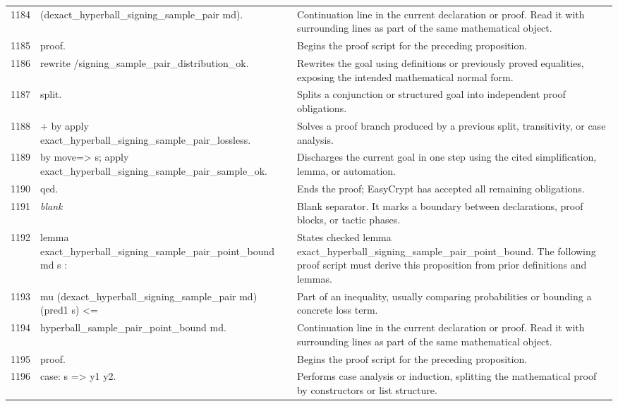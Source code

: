 \documentclass[10pt]{article}
\begin{document}
\begin{longtable}{r L{0.53\textwidth} L{0.37\textwidth}}
1184 & {\ttfamily\scriptsize     (dexact\_hyperball\_signing\_sample\_pair md).} & Continuation line in the current declaration or proof.  Read it with surrounding lines as part of the same mathematical object. \\
1185 & {\ttfamily\scriptsize proof.} & Begins the proof script for the preceding proposition. \\
1186 & {\ttfamily\scriptsize rewrite /signing\_sample\_pair\_distribution\_ok.} & Rewrites the goal using definitions or previously proved equalities, exposing the intended mathematical normal form. \\
1187 & {\ttfamily\scriptsize split.} & Splits a conjunction or structured goal into independent proof obligations. \\
1188 & {\ttfamily\scriptsize + by apply exact\_hyperball\_signing\_sample\_pair\_lossless.} & Solves a proof branch produced by a previous split, transitivity, or case analysis. \\
1189 & {\ttfamily\scriptsize by move=> s; apply exact\_hyperball\_signing\_sample\_pair\_sample\_ok.} & Discharges the current goal in one step using the cited simplification, lemma, or automation. \\
1190 & {\ttfamily\scriptsize qed.} & Ends the proof; EasyCrypt has accepted all remaining obligations. \\
1191 & {\ttfamily\scriptsize \emph{blank}} & Blank separator.  It marks a boundary between declarations, proof blocks, or tactic phases. \\
1192 & {\ttfamily\scriptsize lemma exact\_hyperball\_signing\_sample\_pair\_point\_bound md s :} & States checked lemma exact\_hyperball\_signing\_sample\_pair\_point\_bound.  The following proof script must derive this proposition from prior definitions and lemmas. \\
1193 & {\ttfamily\scriptsize   mu (dexact\_hyperball\_signing\_sample\_pair md) (pred1 s) <=} & Part of an inequality, usually comparing probabilities or bounding a concrete loss term. \\
1194 & {\ttfamily\scriptsize   hyperball\_sample\_pair\_point\_bound md.} & Continuation line in the current declaration or proof.  Read it with surrounding lines as part of the same mathematical object. \\
1195 & {\ttfamily\scriptsize proof.} & Begins the proof script for the preceding proposition. \\
1196 & {\ttfamily\scriptsize case: s => y1 y2.} & Performs case analysis or induction, splitting the mathematical proof by constructors or list structure. \\

\end{longtable}
\end{document}
